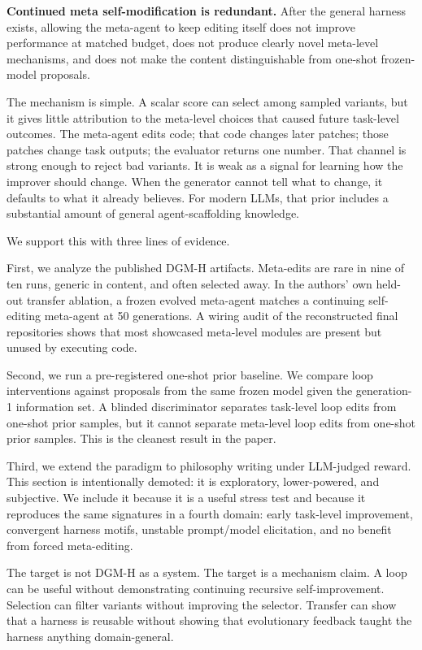 \documentclass[11pt]{article}
\begin{document}
\textbf{Continued meta self-modification is redundant.} After the general harness exists, allowing the meta-agent to keep editing itself does not improve performance at matched budget, does not produce clearly novel meta-level mechanisms, and does not make the content distinguishable from one-shot frozen-model proposals.

The mechanism is simple. A scalar score can select among sampled variants, but it gives little attribution to the meta-level choices that caused future task-level outcomes. The meta-agent edits code; that code changes later patches; those patches change task outputs; the evaluator returns one number. That channel is strong enough to reject bad variants. It is weak as a signal for learning how the improver should change. When the generator cannot tell what to change, it defaults to what it already believes. For modern LLMs, that prior includes a substantial amount of general agent-scaffolding knowledge.

We support this with three lines of evidence.

First, we analyze the published DGM-H artifacts. Meta-edits are rare in nine of ten runs, generic in content, and often selected away. In the authors' own held-out transfer ablation, a frozen evolved meta-agent matches a continuing self-editing meta-agent at 50 generations. A wiring audit of the reconstructed final repositories shows that most showcased meta-level modules are present but unused by executing code.

Second, we run a pre-registered one-shot prior baseline. We compare loop interventions against proposals from the same frozen model given the generation-1 information set. A blinded discriminator separates task-level loop edits from one-shot prior samples, but it cannot separate meta-level loop edits from one-shot prior samples. This is the cleanest result in the paper.

Third, we extend the paradigm to philosophy writing under LLM-judged reward. This section is intentionally demoted: it is exploratory, lower-powered, and subjective. We include it because it is a useful stress test and because it reproduces the same signatures in a fourth domain: early task-level improvement, convergent harness motifs, unstable prompt/model elicitation, and no benefit from forced meta-editing.

The target is not DGM-H as a system. The target is a mechanism claim. A loop can be useful without demonstrating continuing recursive self-improvement. Selection can filter variants without improving the selector. Transfer can show that a harness is reusable without showing that evolutionary feedback taught the harness anything domain-general.
\end{document}
